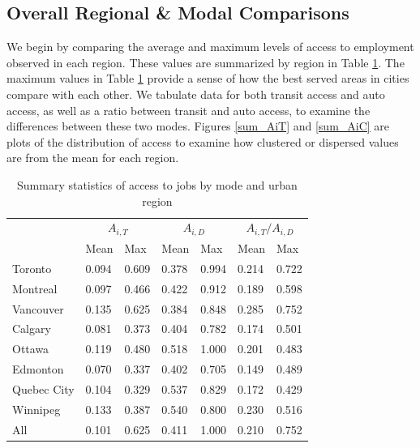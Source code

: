 \documentclass[11 pt, letterpaper]{article}
\begin{document}
{\subsection{Overall Regional \& Modal Comparisons}

We begin by comparing the average and maximum levels of access to employment observed in each region. These values are summarized by region in Table \ref{sumstats}. The maximum values in Table \ref{sumstats} provide a sense of how the best served areas in cities compare with each other. We tabulate data for both transit access and auto access, as well as a ratio between transit and auto access, to examine the differences between these two modes. Figures \ref{sum_AiT} and \ref{sum_AiC} are plots of the distribution of access to examine how clustered or dispersed values are from the mean for each region.

\begin{table}[H]
	\vspace{2mm}
	\centering
	\renewcommand{\arraystretch}{0.75} %
	\small
	\caption{Summary statistics of access to jobs by mode and urban region}
	\vspace{2mm}
	\label{sumstats}
	\begin{tabular}{l|ll|ll|ll}
		\multicolumn{1}{l|}{} & \multicolumn{2}{c|}{$A_{i,T}$} & \multicolumn{2}{c|}{$A_{i,D}$} & \multicolumn{2}{c}{$A_{i,T} / A_{i,D}$} \\
		 & {Mean}  & Max    & {Mean}  & Max   & {Mean}  & Max \\ \cline{2-7}
		\hline
		Toronto     & 0.094 & 0.609 & 0.378 & 0.994 & 0.214 & 0.722 \\
		Montreal    & 0.097 & 0.466 & 0.422 & 0.912 & 0.189 & 0.598 \\
		Vancouver   & 0.135 & 0.625 & 0.384 & 0.848 & 0.285 & 0.752 \\
		Calgary     & 0.081 & 0.373 & 0.404 & 0.782 & 0.174 & 0.501 \\
		Ottawa      & 0.119 & 0.480 & 0.518 & 1.000 & 0.201 & 0.483 \\
		Edmonton    & 0.070 & 0.337 & 0.402 & 0.705 & 0.149 & 0.489 \\
		Quebec City & 0.104 & 0.329 & 0.537 & 0.829 & 0.172 & 0.429 \\
		Winnipeg    & 0.133 & 0.387 & 0.540 & 0.800 & 0.230 & 0.516 \\
		\hline
		All         & 0.101 & 0.625 & 0.411 & 1.000 & 0.210 & 0.752   
	\end{tabular}
\end{table}

}
\end{document}
